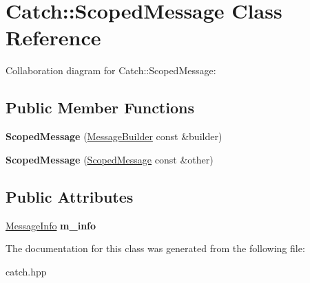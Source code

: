 \hypertarget{class_catch_1_1_scoped_message}{}\section{Catch\+:\+:Scoped\+Message Class Reference}
\label{class_catch_1_1_scoped_message}


Collaboration diagram for Catch\+:\+:Scoped\+Message\+:
\subsection*{Public Member Functions}
\begin{DoxyCompactItemize}
\item 
\mbox{\label{class_catch_1_1_scoped_message_a5cc59f0f2ebe840e6607f83004d49a17}} 
{\bfseries Scoped\+Message} (\hyperlink{struct_catch_1_1_message_builder}{Message\+Builder} const \&builder)
\item 
\mbox{\label{class_catch_1_1_scoped_message_ae03a17fd47220d563d4abc73e7518e29}} 
{\bfseries Scoped\+Message} (\hyperlink{class_catch_1_1_scoped_message}{Scoped\+Message} const \&other)
\end{DoxyCompactItemize}
\subsection*{Public Attributes}
\begin{DoxyCompactItemize}
\item 
\mbox{\label{class_catch_1_1_scoped_message_ae6e1476f389cc6e1586f033b3747b27b}} 
\hyperlink{struct_catch_1_1_message_info}{Message\+Info} {\bfseries m\+\_\+info}
\end{DoxyCompactItemize}


The documentation for this class was generated from the following file\+:\begin{DoxyCompactItemize}
\item 
catch.\+hpp\end{DoxyCompactItemize}
